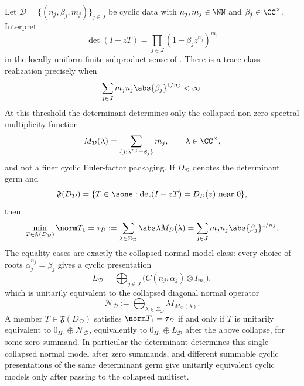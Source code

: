\begin{corollary}
  \label{thm:main-trace-class-rigidity}
  \label{thm:trace-class-rigidity-consequences}
  \label{cor:trace-class-rigidity-consequences}
  Let \(\mathcal D=\{(n_j,\beta_j,m_j)\}_{j\in J}\) be cyclic data with
  \(n_j,m_j\in\NN\) and \(\beta_j\in\CC^\times\).  Interpret
  \[
    \det(I-zT)=\prod_{j\in J}(1-\beta_jz^{n_j})^{m_j}
  \]
  in the locally uniform finite-subproduct sense of
  .  There is a trace-class
  realization precisely when
  \[
    \sum_{j\in J}m_jn_j\abs{\beta_j}^{1/n_j}<\infty .
  \]
  At this threshold the determinant determines only the collapsed non-zero
  spectral multiplicity function
  \[
    M_{\mathcal D}(\lambda)
    =\sum_{\{j:\lambda^{n_j}=\beta_j\}}m_j,
    \qquad \lambda\in\CC^\times,
  \]
  and not a finer cyclic Euler-factor packaging.  If
  \(D_{\mathcal D}\) denotes the determinant germ and
  \[
    \mathfrak F(D_{\mathcal D})
    =\{T\in\sone:\det(I-zT)=D_{\mathcal D}(z)\text{ near }0\},
  \]
  then
  \[
    \min_{T\in\mathfrak F(D_{\mathcal D})}\norm T_1
    =\tau_{\mathcal D}
    :=\sum_{\lambda\in\Sigma_{\mathcal D}}
      \abs\lambda M_{\mathcal D}(\lambda)
    =\sum_{j\in J}m_jn_j\abs{\beta_j}^{1/n_j}.
  \]
  The equality cases are exactly the collapsed normal model class: every
  choice of roots \(\alpha_j^{n_j}=\beta_j\) gives a cyclic presentation
  \[
    L_{\mathcal D}=
    \bigoplus_{j\in J}\bigl(C(n_j,\alpha_j)\otimes I_{m_j}\bigr),
  \]
  which is unitarily equivalent to the collapsed diagonal normal operator
  \[
    \mathcal N_{\mathcal D}:=\bigoplus_{\lambda\in\Sigma_{\mathcal D}}
      \lambda I_{M_{\mathcal D}(\lambda)} .
  \]
  A member \(T\in\mathfrak F(D_{\mathcal D})\) satisfies
  \(\norm T_1=\tau_{\mathcal D}\) if and only if \(T\) is unitarily equivalent
  to \(0_{H_0}\oplus \mathcal N_{\mathcal D}\), equivalently to
  \(0_{H_0}\oplus L_{\mathcal D}\) after the above collapse, for some zero
  summand.  In particular the determinant determines this single collapsed
  normal model after zero summands, and different summable cyclic
  presentations of the same determinant germ give unitarily equivalent cyclic
  models only after passing to the collapsed multiset.
\end{corollary}

